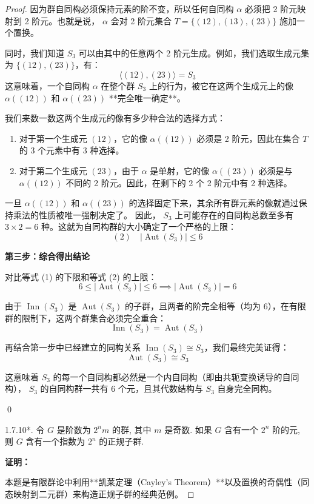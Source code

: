 \documentclass[]{article}
\begin{document}
\begin{proof}
因为群自同构必须保持元素的阶不变，所以任何自同构 $\alpha$ 必须把 2 阶元映射到 2 阶元。也就是说， $\alpha$ 会对 2 阶元集合 $T = \{ (12), (13), (23) \}$ 施加一个置换。

同时，我们知道 $S_3$ 可以由其中的任意两个 2 阶元生成。例如，我们选取生成元集为 $\{ (12), (23) \}$，有：
\[ \langle (12), (23) \rangle = S_3 \]
这意味着，一个自同构 $\alpha$ 在整个群 $S_3$ 上的行为，被它在这两个生成元上的像 $\alpha((12))$ 和 $\alpha((23))$ **完全唯一确定**。

我们来数一数这两个生成元的像有多少种合法的选择方式：
\begin{enumerate}
	\item 对于第一个生成元 $(12)$，它的像 $\alpha((12))$ 必须是 2 阶元，因此在集合 $T$ 的 3 个元素中有 3 种选择。
	\item 对于第二个生成元 $(23)$，由于 $\alpha$ 是单射，它的像 $\alpha((23))$ 必须是与 $\alpha((12))$ 不同的 2 阶元。因此，在剩下的 2 个 2 阶元中有 2 种选择。
\end{enumerate}

一旦 $\alpha((12))$ 和 $\alpha((23))$ 的选择固定下来，其余所有群元素的像就通过保持乘法的性质被唯一强制决定了。
因此， $S_3$ 上可能存在的自同构总数至多有 $3 \times 2 = 6$ 种。这就为自同构群的大小确定了一个严格的上限：
\[ (2) \quad |\operatorname{Aut}(S_3)| \leqslant 6 \]

\bigskip
\noindent \textbf{第三步：综合得出结论}

对比等式 (1) 的下限和等式 (2) 的上限：
\[ 6 \leqslant |\operatorname{Aut}(S_3)| \leqslant 6 \implies |\operatorname{Aut}(S_3)| = 6 \]

由于 $\operatorname{Inn}(S_3)$ 是 $\operatorname{Aut}(S_3)$ 的子群，且两者的阶完全相等（均为 6），在有限群的限制下，这两个群集合必须完全重合：
\[ \operatorname{Inn}(S_3) = \operatorname{Aut}(S_3) \]

再结合第一步中已经建立的同构关系 $\operatorname{Inn}(S_3) \cong S_3$，我们最终完美证得：
\[ \operatorname{Aut}(S_3) \cong S_3 \]

这意味着 $S_3$ 的每一个自同构都必然是一个内自同构（即由共轭变换诱导的自同构）， $S_3$ 的自同构群一共有 6 个元，且其代数结构与 $S_3$ 自身完全同构。

\qed

1.7.10*. 令 $G$ 是阶数为 $2^{n}m$ 的群, 其中 $m$ 是奇数. 如果 $G$ 含有一个 $2^{n}$ 阶的元, 则 $G$ 含有一个指数为 $2^{n}$ 的正规子群. 

\bigskip
\noindent \textbf{证明：} 

本题是有限群论中利用**凯莱定理（Cayley's Theorem）**以及置换的奇偶性（同态映射到二元群）来构造正规子群的经典范例。


\end{proof}
\end{document}
